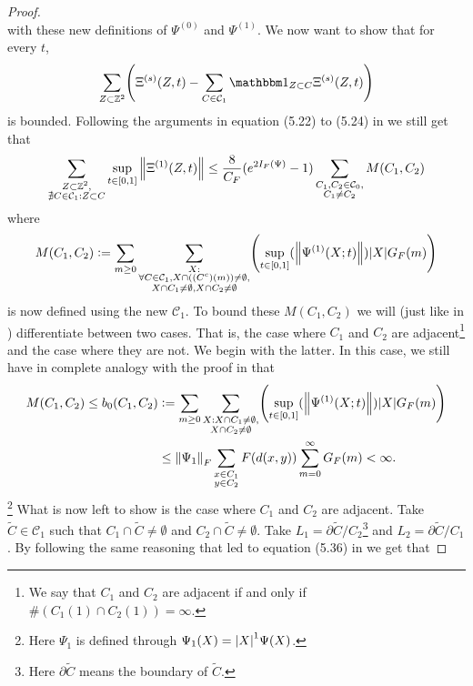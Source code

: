 \documentclass[11pt,a4paper,twoside]{article}
\numberwithin{equation}{section}
\begin{document}
{\begin{proof}
\begin{equation}
		\end{equation}
		with these new definitions of $\Psi^{(0)}$ and $\Psi^{(1)}$. We now want to show that for every $t$,
		\begin{equation}
			\sum_{Z\subset\ZZ^2}\left(\Xi^{(s)}(Z,t)-\sum_{C\in\mathcal{C}_1}\id_{Z\subset C}\Xi^{(s)}(Z,t)\right)
		\end{equation}
		is bounded. Following the arguments in equation (5.22) to (5.24) in \cite{ogata2021h3gmathbb} we still get that
		\begin{equation}
			\sum_{\substack{Z\subset\mathbb Z^2,\\\nexists C\in\mathcal{C}_1:Z\subset C}}\sup_{t\in[0,1]}\norm{\Xi^{(1)}(Z,t)}\leq \frac{8}{C_F}(e^{2I_F(\Psi)}-1)\sum_{\substack{C_1,C_2\in\mathcal{C}_0,\\ C_1\neq C_2}}M(C_1,C_2)
		\end{equation}
		where
		\begin{equation}
			M(C_1,C_2)\defeq \sum_{m\geq 0}\sum_{\substack{X:\\\forall C\in\mathcal{C}_1,X\cap((C^c)(m))\neq\emptyset,\\X\cap C_1\neq\emptyset,X\cap C_2\neq\emptyset}}\left(\sup_{t\in[0,1]}(\norm{\Psi^{(1)}(X;t)})\abs{X}G_F(m)\right)
		\end{equation}
		is now defined using the new $\mathcal{C}_1$. To bound these $M(C_1,C_2)$ we will (just like in \cite{ogata2021h3gmathbb}) differentiate between two cases. That is, the case where $C_1$ and $C_2$ are adjacent\footnote{We say that $C_1$ and $C_2$ are adjacent if and only if $\#(C_1(1)\cap C_2(1))=\infty$.} and the case where they are not. We begin with the latter. In this case, we still have in complete analogy with the proof in \cite{ogata2021h3gmathbb} that
		\begin{align}
			M(C_1,C_2)\leq b_0(C_1,C_2) &\defeq \sum_{m\geq 0}\sum_{\substack{X:X\cap C_1\neq\emptyset,\\X\cap C_2\neq\emptyset}}\left(\sup_{t\in[0,1]}(\norm{\Psi^{(1)}(X;t)})\abs{X}G_F(m)\right)\\
			&\leq \norm{\Psi_1}_F\sum_{\substack{x\in C_1\\y\in C_2}}F(d(x,y))\sum_{m=0}^\infty G_F(m)<\infty.
		\end{align}
		\footnote{Here $\Psi_1$ is defined through $\Psi_1(X)=\abs{X}^1 \Psi(X)$.} What is now left to show is the case where $C_1$ and $C_2$ are adjacent. Take $\tilde{C}\in\mathcal{C}_1$ such that $C_1\cap\tilde{C}\neq\emptyset$ and $C_2\cap\tilde{C}\neq\emptyset$. Take $L_1=\partial\tilde{C}/C_2$\footnote{Here $\partial \tilde{C}$ means the boundary of $\tilde C$.} and $L_2=\partial\tilde{C}/C_1$. By following the same reasoning that led to equation (5.36) in \cite{ogata2021h3gmathbb} we get that

\end{proof}}
\end{document}
